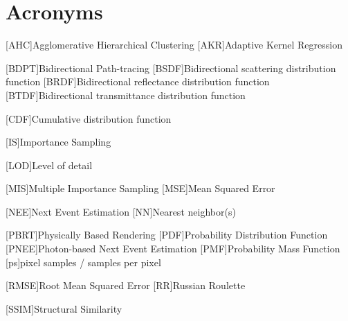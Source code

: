 \newpage
\section*{Acronyms}

\begin{acronym}[ECU]


[AHC]{Agglomerative Hierarchical Clustering}
[AKR]{Adaptive Kernel Regression}

[BDPT]{Bidirectional Path-tracing}
[BSDF]{Bidirectional scattering distribution function}
[BRDF]{Bidirectional reflectance distribution function}
[BTDF]{Bidirectional transmittance distribution function}

[CDF]{Cumulative distribution function}

[IS]{Importance Sampling}

[LOD]{Level of detail}

[MIS]{Multiple Importance Sampling}
[MSE]{Mean Squared Error}

[NEE]{Next Event Estimation}
[NN]{Nearest neighbor(s)}

[PBRT]{Physically Based Rendering}
[PDF]{Probability Distribution Function}
[PNEE]{Photon-based Next Event Estimation}
[PMF]{Probability Mass Function}
[ps]{pixel samples / samples per pixel}

[RMSE]{Root Mean Squared Error}
[RR]{Russian Roulette}

[SSIM]{Structural Similarity}

\end{acronym}
